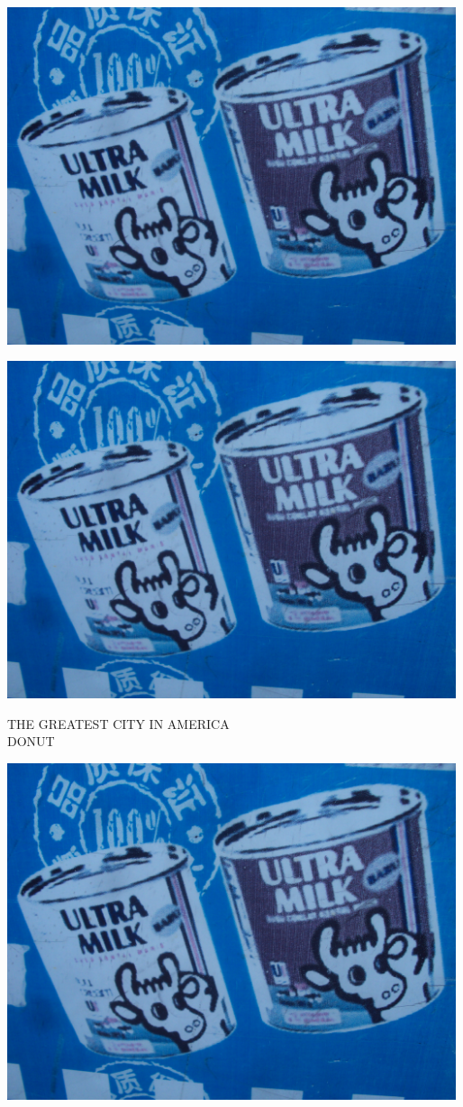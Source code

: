 \documentclass[10pt,letterpaper]{article}
\begin{document}
\includegraphics[width=5.19in]{landscape.jpg}

\vspace{0.25in}
\includegraphics[width=5.19in]{landscape.jpg}

THE GREATEST CITY IN AMERICA\\
DONUT\\
\pagebreak

\includegraphics[width=5.19in]{landscape.jpg}
\end{document}
